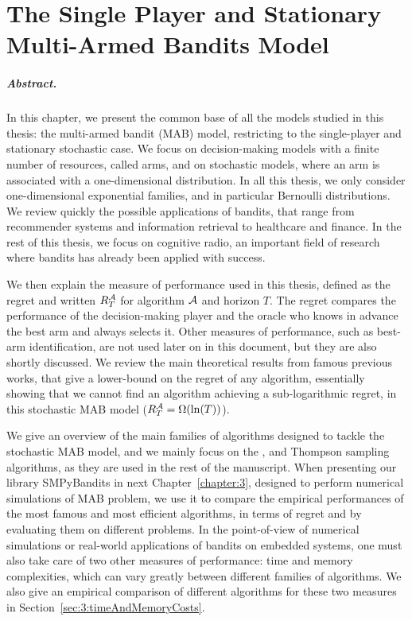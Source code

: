 
\chapter{The Single Player and Stationary Multi-Armed Bandits Model}
\label{chapter:2}
\minitoc

\newpage
{}

\paragraph{Abstract.}
%
In this chapter, we present the common base of all the models studied in this thesis:
the multi-armed bandit (MAB) model,
restricting to the single-player and stationary stochastic case.
We focus on decision-making models with a finite number of resources, called arms, and on stochastic models, where an arm is associated with a one-dimensional distribution.
In all this thesis, we only consider one-dimensional exponential families, and in particular Bernoulli distributions.
%
We review quickly the possible applications of bandits, that range from recommender systems and information retrieval to healthcare and finance. In the rest of this thesis, we focus on cognitive radio, an important field of research where bandits has already been applied with success.

We then explain the measure of performance used in this thesis, defined as the regret and written $R_T^{\mathcal{A}}$ for algorithm $\mathcal{A}$ and horizon $T$. The regret compares the performance of the decision-making player and the oracle who knows in advance the best arm and always selects it.
Other measures of performance, such as best-arm identification, are not used later on in this document, but they are also shortly discussed.
%
We review the main theoretical results from famous previous works, that give a lower-bound on the regret of any algorithm, essentially showing that we cannot find an algorithm achieving a sub-logarithmic regret, in this stochastic MAB model ($R_T^{\mathcal{A}} = \Omega(\ln(T))$).

We give an overview of the main families of algorithms designed to tackle the stochastic MAB model, and we mainly focus on the \UCB, \klUCB{} and Thompson sampling algorithms, as they are used in the rest of the manuscript.
When presenting our library SMPyBandits in next Chapter~\ref{chapter:3}, designed to perform numerical simulations of MAB problem, we use it to compare the empirical performances of the most famous and most efficient algorithms, in terms of regret and by evaluating them on different problems.
%
In the point-of-view of numerical simulations or real-world applications of bandits on embedded systems, one must also take care of two other measures of performance: time and memory complexities, which can vary greatly between different families of algorithms.
We also give an empirical comparison of different algorithms for these two measures in Section~\ref{sec:3:timeAndMemoryCosts}.

